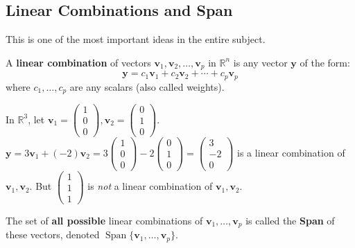 \subsection{Linear Combinations and Span}

This is one of the most important ideas in the entire subject.

\begin{definition}
A \textbf{linear combination} of vectors $\mathbf{v}_1, \mathbf{v}_2, \ldots, \mathbf{v}_p$ in $\mathbb{R}^n$ is any vector $\mathbf{y}$ of the form:
\[ \mathbf{y} = c_1\mathbf{v}_1 + c_2\mathbf{v}_2 + \cdots + c_p\mathbf{v}_p \]
where $c_1, \ldots, c_p$ are any scalars (also called weights).
\end{definition}

\begin{example}
In $\mathbb{R}^3$, let $\mathbf{v}_1 = \begin{pmatrix} 1 \\ 0 \\ 0 \end{pmatrix}, \mathbf{v}_2 = \begin{pmatrix} 0 \\ 1 \\ 0 \end{pmatrix}$.
$\mathbf{y} = 3\mathbf{v}_1 + (-2)\mathbf{v}_2 = 3\begin{pmatrix} 1 \\ 0 \\ 0 \end{pmatrix} - 2\begin{pmatrix} 0 \\ 1 \\ 0 \end{pmatrix} = \begin{pmatrix} 3 \\ -2 \\ 0 \end{pmatrix}$ is a linear combination of $\mathbf{v}_1, \mathbf{v}_2$.
But $\begin{pmatrix} 1 \\ 1 \\ 1 \end{pmatrix}$ is \emph{not} a linear combination of $\mathbf{v}_1, \mathbf{v}_2$.
\end{example}

\begin{definition}
The set of \textbf{all possible} linear combinations of $\mathbf{v}_1, \ldots, \mathbf{v}_p$ is called the \textbf{Span} of these vectors, denoted $\operatorname{Span}\{\mathbf{v}_1, \ldots, \mathbf{v}_p\}$.
\end{definition}


